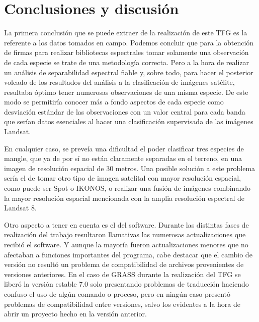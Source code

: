 


\chapter{Conclusiones y discusión}

La primera conclusión que se puede extraer de la realización de este \ac{TFG} es la referente a los datos tomados en campo. Podemos concluir que para la obtención de firmas para realizar bibliotecas espectrales tomar solamente una observación de cada especie se trate de una metodología correcta. Pero a la hora de realizar un análisis de separabilidad espectral fiable y, sobre todo, para hacer el posterior volcado de los resultados del análisis a la clasificación de imágenes satélite, resultaba óptimo tener numerosas observaciones de una misma especie. De este modo se permitiría conocer más a fondo aspectos de cada especie como desviación estándar de las observaciones con un valor central para cada banda que serían datos esenciales al hacer una clasificación supervisada de las imágenes Landsat.%

En cualquier caso, se preveía una dificultad el poder clasificar tres especies de mangle, que ya de por sí no están claramente separadas en el terreno, en una imagen de resolución espacial de 30 metros. Una posible solución a este problema sería el de tomar otro tipo de imagen satelital con mayor resolución espacial, como puede ser Spot o IKONOS, o realizar una fusión de imágenes combinando la mayor resolución espacial mencionada con la amplia resolución espectral de Landsat 8.%

Otro aspecto a tener en cuenta es el del software. Durante las distintas fases de realización del trabajo resultaron llamativas las numerosas actualizaciones que recibió el software. Y aunque la mayoría fueron actualizaciones menores que no afectaban a funciones importantes del programa, cabe destacar que el cambio de versión no resultó un problema de compatibilidad de archivos provenientes de versiones anteriores. En el caso de GRASS durante la realización del \ac{TFG} se liberó la versión estable 7.0 solo presentando problemas de traducción haciendo confuso el uso de algún comando o proceso, pero en ningún caso presentó problemas de compatibilidad entre versiones, salvo los evidentes a la hora de abrir un proyecto hecho en la versión anterior.%

